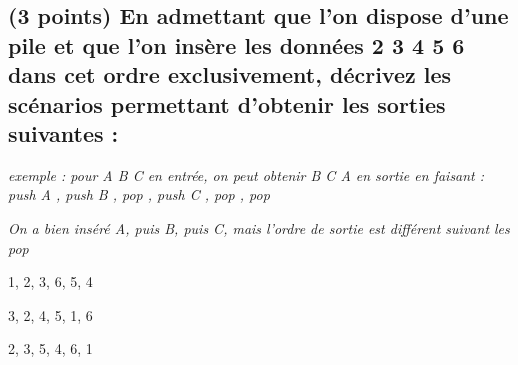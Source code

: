 \documentclass[11pt,a4paper]{article}
\begin{document}
\bigskip
\bigskip



\vfillLast

\clearpage

\subsection{(3 points) En admettant que l'on dispose d'une pile et que l'on insère les données  2 3 4 5 6 \fg{} dans cet ordre exclusivement, décrivez les scénarios permettant d'obtenir les sorties suivantes : }


\medskip

\begin{center}
\noindent \textit{exemple : pour \og A B C \fg{} en entrée, on peut obtenir \og B C A \fg{} en sortie en faisant : \linebreak
\og push A \fg, \og push B \fg, \og pop \fg, \og push C \fg, \og pop \fg, \og pop \fg }

\noindent \textit{On a bien inséré A, puis B, puis C, mais l'ordre de sortie est différent suivant les \og pop \fg}
\end{center}

\medskip



\begin{center}

\begin{large}
1, 2, 3, 6, 5, 4
\end{large}

\begin{center}
\end{center}


\begin{large}
3, 2, 4, 5, 1, 6
\end{large}

\begin{center}
\end{center}


\begin{large}
2, 3, 5, 4, 6, 1
\end{large}

\begin{center}
\end{center}

\end{center}
\end{document}
